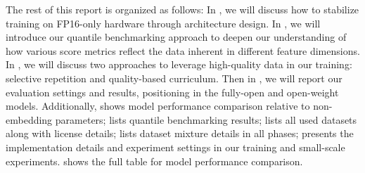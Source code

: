 The rest of this report is organized as follows: In , we will discuss how to stabilize training on FP16-only hardware through architecture design. In , we will introduce our quantile benchmarking approach to deepen our understanding of how various score metrics reflect the data inherent in different feature dimensions. In , we will discuss two approaches to leverage high-quality data in our training: selective repetition and quality-based curriculum. Then in , we will report our evaluation settings and results, positioning \sys in the fully-open and open-weight models. Additionally,  shows model performance comparison relative to non-embedding parameters;  lists quantile benchmarking results;  lists all used datasets along with license details;  lists dataset mixture details in all phases;  presents the implementation details and experiment settings in our training and small-scale experiments.  shows the full table for model performance comparison.




























